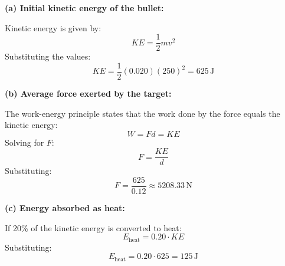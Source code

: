 \documentclass[addpoints]{exam}
\begin{document}
\begin{questions}
\begin{solution}[6cm]
\textbf{(a) Initial kinetic energy of the bullet:}

    Kinetic energy is given by:
    \[
    KE = \frac{1}{2} m v^2
    \]
    Substituting the values:
    \[
    KE = \frac{1}{2} (0.020) (250)^2 = 625 \, \text{J}
    \]

    \textbf{(b) Average force exerted by the target:}

    The work-energy principle states that the work done by the force equals the kinetic energy:
    \[
    W = F d = KE
    \]
    Solving for \(F\):
    \[
    F = \frac{KE}{d}
    \]
    Substituting:
    \[
    F = \frac{625}{0.12} \approx 5208.33 \, \text{N}
    \]

    \textbf{(c) Energy absorbed as heat:}

    If 20\% of the kinetic energy is converted to heat:
    \[
    E_\text{heat} = 0.20 \cdot KE
    \]
    Substituting:
    \[
    E_\text{heat} = 0.20 \cdot 625 = 125 \, \text{J}
    \]

\end{solution}

\end{questions}
\end{document}
